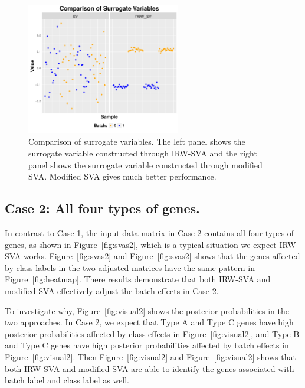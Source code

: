 \documentclass[11pt]{article}
\begin{document}
\begin{figure}
    \centering
    \includegraphics[width = 0.6\textwidth]{figures/vector1.pdf}
    \caption{Comparison of surrogate variables. The left panel shows the surrogate variable constructed through IRW-SVA and the right panel shows the surrogate variable constructed through modified SVA. Modified SVA gives much better performance.}
    \label{fig:vector1}
\end{figure}

\newpage

\subsection{Case 2: All four types of genes.}

In contrast to Case 1, the input data matrix in Case 2 contains all four types of genes, as shown in Figure~\ref{fig:svas2}, which is a typical situation we expect IRW-SVA works. Figure~\ref{fig:svas2} and Figure~\ref{fig:svas2} shows that the genes affected by class labels in the two adjusted matrices have the same pattern in Figure~\ref{fig:heatmap}. There results demonstrate that both IRW-SVA and modified SVA effectively adjust the batch effects in Case 2.  

To investigate why, Figure~\ref{fig:visual2} shows the posterior probabilities in the two approaches. In Case 2, we expect that Type A and Type C genes have high posterior probabilities affected by class effects in Figure~\ref{fig:visual2}, and Type B and Type C genes  have high posterior probabilities affected by batch effects in Figure~\ref{fig:visual2}. Then Figure~\ref{fig:visual2} and Figure~\ref{fig:visual2} shows that both IRW-SVA and modified SVA are able to identify the genes associated with batch label and class label as well. 
\end{document}
